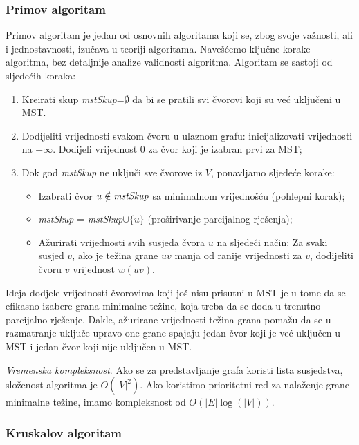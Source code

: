 \documentclass[a4paper, utf8, 11pt, colorlinks]{book}
\theoremstyle{definition}
\begin{document}
\subsubsection{Primov algoritam}

Primov algoritam je jedan od osnovnih algoritama koji se, zbog svoje važnosti, ali i jednostavnosti, izučava u teoriji algoritama. Navešćemo ključne korake algoritma, bez detaljnije analize validnosti algoritma. Algoritam se sastoji od sljedećih koraka:

\begin{enumerate}
	\item Kreirati skup \emph{mstSkup}=$\emptyset$ da bi se pratili svi čvorovi koji su već uključeni u MST.
	\item Dodijeliti vrijednosti svakom čvoru u ulaznom grafu: inicijalizovati vrijednosti na +$\infty$. 
	      Dodijeli vrijednost  0 za čvor koji je izabran prvi za MST;
	\item Dok god \emph{mstSkup} ne uključi sve čvorove iz $V$, ponavljamo sljedeće korake:
	\begin{itemize}
		\item Izabrati čvor $u\notin\emph{mstSkup} $ sa minimalnom vrijednošću (pohlepni korak);
		\item \emph{mstSkup} = \emph{mstSkup}$\cup \{u\}$ (proširivanje parcijalnog rješenja);
		\item Ažurirati vrijednosti svih susjeda čvora $u$ na sljedeći način:
		     Za svaki susjed $v$, ako je težina grane $uv$ manja od
		             ranije vrijednosti za $v$, dodijeliti  čvoru $v$ vrijednost $w(uv)$. 		    
	        
	\end{itemize}
\end{enumerate}

Ideja dodjele vrijednosti čvorovima koji još nisu prisutni u MST je u tome da se efikasno izabere grana minimalne težine, koja treba da se doda u trenutno parcijalno rješenje. Dakle, ažurirane vrijednosti težina grana pomažu da se u razmatranje uključe upravo one grane spajaju jedan čvor koji je već uključen u MST i jedan čvor koji nije uključen u MST.

 \emph{Vremenska kompleksnost}. Ako se za predstavljanje grafa koristi lista susjedstva, složenost algoritma je $O(|V|^2)$. Ako  koristimo prioritetni red za nalaženje grane minimalne težine, imamo kompleksnost od $O( |E| \log(|V|))$. 



\subsubsection{Kruskalov algoritam}
\end{document}
